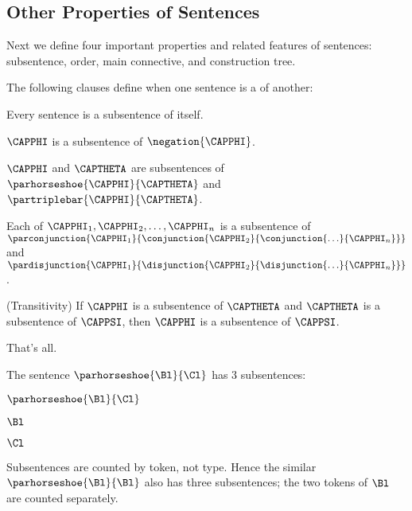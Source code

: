 \subsection{Other Properties of Sentences}\label{Other Properties of GSL Sentences}
Next we define four important properties and related features of sentences: subsentence, order, main connective, and construction tree. 
\begin{majorILnc}{}
The following clauses define when one sentence is a  of another:
\begin{cenumerate}
\item\label{ss1} Every sentence is a subsentence of itself.
\item $\CAPPHI$ is a subsentence of $\negation{\CAPPHI}$.
\item $\CAPPHI$ and $\CAPTHETA$ are subsentences of $\parhorseshoe{\CAPPHI}{\CAPTHETA}$ and $\partriplebar{\CAPPHI}{\CAPTHETA}$.
\item\label{ss4} Each of $\CAPPHI_1,\CAPPHI_2,\ldots,\CAPPHI_{\integer{n}}$ is a subsentence of $\parconjunction{\CAPPHI_1}{\conjunction{\CAPPHI_2}{\conjunction{\ldots}{\CAPPHI_{\integer{n}}}}}$\\ and $\pardisjunction{\CAPPHI_1}{\disjunction{\CAPPHI_2}{\disjunction{\ldots}{\CAPPHI_{\integer{n}}}}}$.
\item\label{ss5} (Transitivity) If $\CAPPHI$ is a subsentence of $\CAPTHETA$ and $\CAPTHETA$ is a subsentence of $\CAPPSI$, then $\CAPPHI$ is a subsentence of $\CAPPSI$.
\item\label{ss6} That's all. 
\end{cenumerate}
\end{majorILnc}
\begin{majorILnc}{}
	The sentence $\parhorseshoe{\Bl}{\Cl}$ has 3 subsentences:
	\begin{cenumerate}
		\item $\parhorseshoe{\Bl}{\Cl}$
		\item $\Bl$
		\item $\Cl$
	\end{cenumerate}
\end{majorILnc}
\noindent{}Subsentences are counted by token, not type. Hence the similar $\parhorseshoe{\Bl}{\Bl}$ also has three subsentences; the two tokens of $\Bl$ are counted separately.
